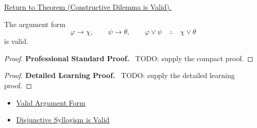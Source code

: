 \newpage
{}
\label{prf:constructive-dilemma-validity-propositional-logic}

\begin{remark*}[Return]
\hyperref[thm:constructive-dilemma-validity-propositional-logic]{Return to Theorem (Constructive Dilemma is Valid).}
\end{remark*}

\begin{theorem*}
The argument form
\[
\varphi\to\chi,\qquad \psi\to\theta,\qquad \varphi\lor\psi
\quad\therefore\quad
\chi\lor\theta
\]
is valid.
\end{theorem*}

\begin{proof}
\textbf{Professional Standard Proof.}~
TODO: supply the compact proof.
\end{proof}

\begin{proof}
\textbf{Detailed Learning Proof.}~
TODO: supply the detailed learning proof.
\end{proof}

\begin{remark*}
\end{remark*}

\begin{dependencies}
\begin{itemize}
  \item \hyperref[def:valid-argument-form-propositional-logic]{Valid Argument Form}
  \item \hyperref[thm:disjunctive-syllogism-validity-propositional-logic]{Disjunctive Syllogism is Valid}
\end{itemize}
\end{dependencies}

\clearpage
